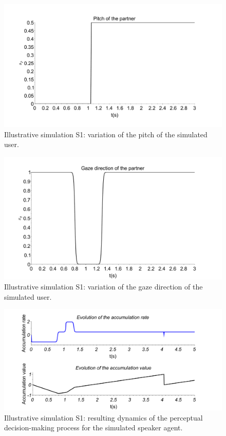 \begin{figure}%
  \centering
  \includegraphics[width=\linewidth]{figure/Pitch_partenaire.pdf}
  \caption{Illustrative simulation S1: variation of the pitch of the simulated user.}
  \label{fig-pitch-user1}
\end{figure}

\begin{figure}
  \center
  \includegraphics[width=\linewidth]{figure/Gaze_partenaire.pdf}
  \caption{Illustrative simulation S1: variation of the gaze direction of the simulated user.}
  \label{fig-gaze-user1}
\end{figure}

\begin{figure}
  \centering
  \includegraphics[width=\linewidth]{figure/illustration_ddm_speaker.pdf}
  \caption{Illustrative simulation S1: resulting dynamics of the perceptual decision-making process for the simulated speaker agent.}
  \label{acc_example}
\end{figure}

